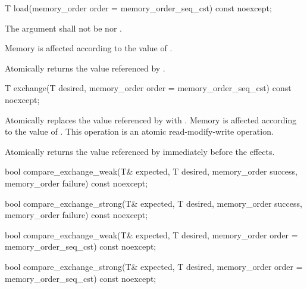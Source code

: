 \begin{itemdecl}
T load(memory_order order = memory_order_seq_cst) const noexcept;
\end{itemdecl}

\begin{itemdescr}
\pnum
\removed{\requires}\added{\expects} The  argument shall not be
 nor .

\effects  Memory is affected according to the value of .

\pnum
\returns Atomically returns the value referenced by .
\end{itemdescr}


\begin{itemdecl}
T exchange(T desired, memory_order order = memory_order_seq_cst) const noexcept;
\end{itemdecl}

\begin{itemdescr}
\pnum
\effects Atomically replaces the value referenced by  with .
Memory is affected according to the value of .
This operation is an atomic read-modify-write operation.

\pnum
\returns Atomically returns the value referenced by 
immediately before the effects.
\end{itemdescr}


\begin{itemdecl}
bool compare_exchange_weak(T& expected, T desired,
                           memory_order success, memory_order failure) const noexcept;

bool compare_exchange_strong(T& expected, T desired,
                             memory_order success, memory_order failure) const noexcept;

bool compare_exchange_weak(T& expected, T desired,
                           memory_order order = memory_order_seq_cst) const noexcept;

bool compare_exchange_strong(T& expected, T desired,
                             memory_order order = memory_order_seq_cst) const noexcept;
\end{itemdecl}

